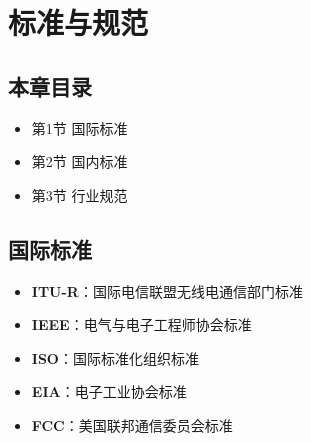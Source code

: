 
\chapter{标准与规范}
\label{chap:standards}

\section{本章目录}
\begin{itemize}
    \item 第1节 国际标准
    \item 第2节 国内标准
    \item 第3节 行业规范
\end{itemize}

\section{国际标准}

\begin{itemize}
    \item \textbf{ITU-R}：国际电信联盟无线电通信部门标准
    \item \textbf{IEEE}：电气与电子工程师协会标准
    \item \textbf{ISO}：国际标准化组织标准
    \item \textbf{EIA}：电子工业协会标准
    \item \textbf{FCC}：美国联邦通信委员会标准
\end{itemize}

